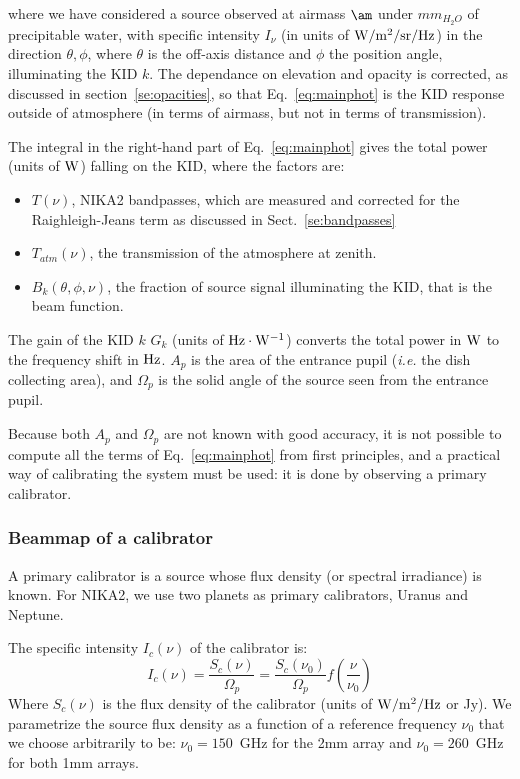 where we have considered a source observed at airmass $\am$ under
$mm_{H_{2}O}$ of precipitable water, with specific intensity $I_{\nu}$ (in units
of  ${\rm W/m^{2}/sr/Hz}$) in the direction $\theta, \phi$, where $\theta$
is the off-axis distance and $\phi$ the position angle, illuminating the KID $k$. 
The dependance on elevation and opacity is corrected, as discussed in
section~\ref{se:opacities}, so that Eq.~\ref{eq:mainphot} is the KID
response outside of atmosphere (in terms of airmass, but not in terms
of transmission).

The integral in the right-hand part of Eq.~\ref{eq:mainphot} gives the total power (units of $\rm W$)
falling on the KID, where the factors are:
\begin{itemize}
\item $T(\nu)$, NIKA2 bandpasses, which are measured and corrected for the Raighleigh-Jeans term as discussed in Sect.~\ref{se:bandpasses}
\item $T_{atm}(\nu)$, the transmission of the atmosphere at zenith. 
\item $B_{k} (\theta, \phi, \nu)$, the fraction of source signal illuminating the KID, that is the beam function.  
\end{itemize}

The gain of the KID $k$ $G_{k}$ (units of  $\rm Hz \cdot \rm W^{-1}$) converts the total power in $\rm W$
to the frequency shift in $\rm Hz$. $A_{p}$ is the area of the entrance pupil ({\it i.e.} the
dish collecting area), and $\Omega_{p}$ is the solid angle of the source seen from the
entrance pupil.

Because both $A_{p}$ and $ \Omega_{p} $ are not known with good
accuracy, it is not possible to compute all the terms of
Eq.~\ref{eq:mainphot} from first principles, and a practical way of
calibrating the system must be used: it is done by observing a primary
calibrator.


\subsubsection{Beammap of a calibrator}

A primary calibrator is a source whose flux density (or spectral irradiance) is
known. For NIKA2, we use two planets as primary calibrators, Uranus
and Neptune.


The specific intensity $I_{c}(\nu)$ of the
calibrator is:
\begin{equation}
I_{c}(\nu) =  \frac{S_{c}(\nu)}{\Omega_{p}} =\frac{ S_{c}
(\nu_{0})}{\Omega_{p}} f(\frac{\nu}{\nu_{0}})  
\end{equation}
Where $S_{c}(\nu)$ is the flux density of the calibrator (units
of $\rm W/m^{2}/Hz$ or Jy). We parametrize the source flux density
as a function of a reference frequency $\nu_{0}$ that we choose
arbitrarily to be: $\nu_{0} = 150$~GHz for the 2mm array and $\nu_{0}
= 260$~GHz for both 1mm arrays. 


